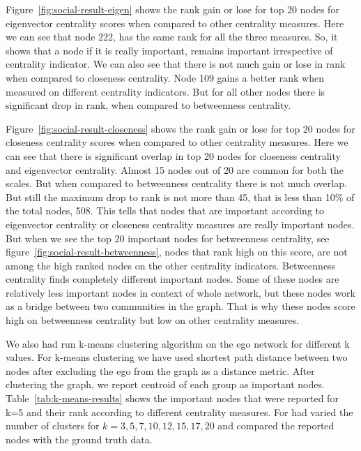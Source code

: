 Figure~\ref{fig:social-result-eigen} shows the rank gain or lose for
top 20 nodes for eigenvector centrality scores when compared to other
centrality measures.  Here we can see that node 222, has the same rank
for all the three measures.  So, it shows that a node if it is really
important, remains important irrespective of centrality indicator.  We
can also see that there is not much gain or lose in rank when compared
to closeness centrality.  Node 109 gains a better rank when measured
on different centrality indicators.  But for all other nodes there is
significant drop in rank, when compared to betweenness centrality.

Figure~\ref{fig:social-result-closeness} shows the rank gain or lose for
top 20 nodes for closeness centrality scores when compared to other
centrality measures.  Here we can see that there is significant
overlap in top 20 nodes for closeness centrality and eigenvector
centrality.  Almost 15 nodes out of 20 are common for both the scales.
But when compared to betweenness centrality there is not much overlap.
But still the maximum drop to rank is not more than 45, that is less
than 10\% of the total nodes, 508.  This tells
that nodes that are important according to eigenvector centrality or
closeness centrality measures are really important nodes.  But when we
see the top 20 important nodes for betweenness centrality, see
figure~\ref{fig:social-result-betweenness}, nodes that rank high on
this score, are not among the high ranked nodes on the other
centrality indicators.  Betweenness centrality finds completely
different important nodes.  Some of these nodes are relatively less
important nodes in context of whole network, but these nodes work as a
bridge between two communities in the graph.  That is why these nodes
score high on betweenness centrality but low on other centrality
measures.



We also had run k-means clustering algorithm on the ego network for
different k values.  For k-means clustering we have used shortest path
distance between two nodes after excluding the ego from the graph as a
distance metric.  After clustering the graph, we report centroid of
each group as important nodes.  Table~\ref{tab:k-means-results} shows
the important nodes that were reported for k=5 and their rank
according to different centrality measures.  For had varied the number
of clusters for $k=3,5,7,10,12,15,17,20$ and compared the reported
nodes with the ground truth data.

